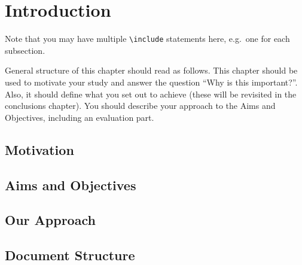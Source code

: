 \chapter{Introduction}

Note that you may have multiple \texttt{{\textbackslash}include} statements here, e.g.\ one for each subsection.

General structure of this chapter should read as follows.  This chapter should be used to motivate your study and answer the question ``Why is this important?''. Also, it should define what you set out to achieve (these will be revisited in the conclusions chapter). You should describe your approach to the Aims and Objectives, including an evaluation part.  %

\section{Motivation} %
\blindtext

\section{Aims and Objectives} 
\blindtext

\section{Our Approach} 
\blindtext

\section{Document Structure}
\blindtext
